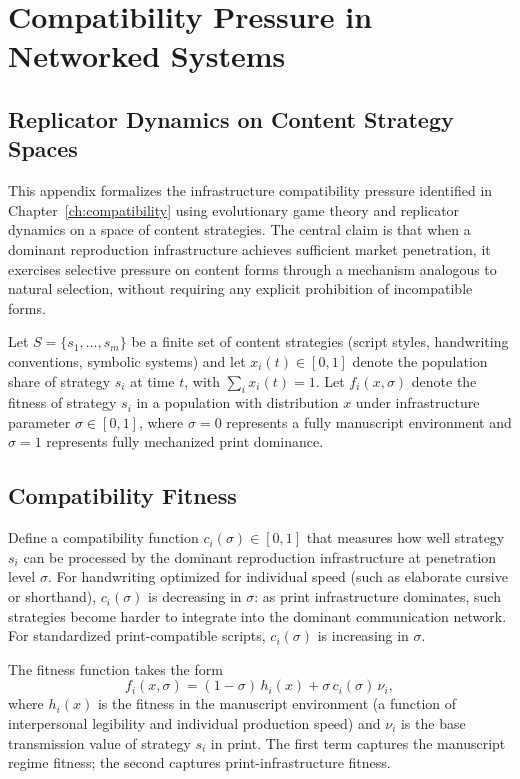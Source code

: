 \documentclass[12pt, oneside]{book}
\theoremstyle{plain}
\theoremstyle{definition}
\theoremstyle{remark}
\theoremstyle{definition}
\begin{document}
\chapter{Compatibility Pressure in Networked Systems}
\label{app:compatibility}

\section{Replicator Dynamics on Content Strategy Spaces}

This appendix formalizes the infrastructure compatibility pressure identified in
Chapter~\ref{ch:compatibility} using evolutionary game theory and replicator
dynamics on a space of content strategies. The central claim is that when a dominant
reproduction infrastructure achieves sufficient market penetration, it exercises
selective pressure on content forms through a mechanism analogous to natural
selection, without requiring any explicit prohibition of incompatible forms.

Let $S = \{s_1, \ldots, s_m\}$ be a finite set of content strategies (script styles,
handwriting conventions, symbolic systems) and let $x_i(t) \in [0,1]$ denote the
population share of strategy $s_i$ at time $t$, with $\sum_i x_i(t) = 1$. Let
$f_i(x, \sigma)$ denote the fitness of strategy $s_i$ in a population with
distribution $x$ under infrastructure parameter $\sigma \in [0,1]$, where
$\sigma = 0$ represents a fully manuscript environment and $\sigma = 1$ represents
fully mechanized print dominance.

\section{Compatibility Fitness}

Define a compatibility function $c_i(\sigma) \in [0,1]$ that measures how well
strategy $s_i$ can be processed by the dominant reproduction infrastructure at
penetration level $\sigma$. For handwriting optimized for individual speed (such
as elaborate cursive or shorthand), $c_i(\sigma)$ is decreasing in $\sigma$: as
print infrastructure dominates, such strategies become harder to integrate into
the dominant communication network. For standardized print-compatible scripts,
$c_i(\sigma)$ is increasing in $\sigma$.

The fitness function takes the form
\[
f_i(x, \sigma) = (1 - \sigma)\, h_i(x) + \sigma\, c_i(\sigma)\, \nu_i,
\]
where $h_i(x)$ is the fitness in the manuscript environment (a function of
interpersonal legibility and individual production speed) and $\nu_i$ is the
base transmission value of strategy $s_i$ in print. The first term captures the
manuscript regime fitness; the second captures print-infrastructure fitness.
\end{document}
